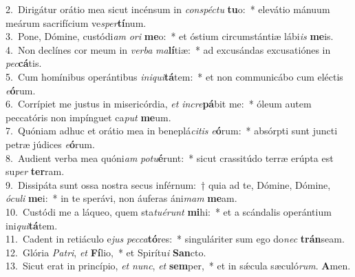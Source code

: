 {2.~}Dirigátur orátio mea sicut incénsum in \textit{con}\textit{spé}\textit{ctu} \textbf{tu}o:~* elevátio mánuum meárum sacrifícium ve\textit{sper}\textbf{tí}num.\\
{3.~}Pone, Dómine, custódi\textit{am} \textit{o}\textit{ri} \textbf{me}o:~* et óstium circumstántiæ lábi\textit{is} \textbf{me}is.\\
{4.~}Non declínes cor meum in \textit{ver}\textit{ba} \textit{ma}\textbf{lí}tiæ:~* ad excusándas excusatiónes in \textit{pec}\textbf{cá}tis.\\
{5.~}Cum homínibus operántibus \textit{i}\textit{ni}\textit{qui}\textbf{tá}tem:~* et non communicábo cum eléctis \textit{e}\textbf{ó}rum.\\
{6.~}Corrípiet me justus in misericórdia, \textit{et} \textit{in}\textit{cre}\textbf{pá}bit me:~* óleum autem peccatóris non impínguet ca\textit{put} \textbf{me}um.\\
{7.~}Quóniam adhuc et orátio mea in beneplá\textit{ci}\textit{tis} \textit{e}\textbf{ó}rum:~* absórpti sunt juncti petræ júdices \textit{e}\textbf{ó}rum.\\
{8.~}Audient verba mea quóni\textit{am} \textit{po}\textit{tu}\textbf{é}runt:~* sicut crassitúdo terræ erúpta est su\textit{per} \textbf{ter}ram.\\
{9.~}Dissipáta sunt ossa nostra secus inférnum:~† quia ad te, Dómine, Dómine, \textit{ó}\textit{cu}\textit{li} \textbf{me}i:~* in te sperávi, non áuferas áni\textit{mam} \textbf{me}am.\\
{10.~}Custódi me a láqueo, quem sta\textit{tu}\textit{é}\textit{runt} \textbf{mi}hi:~* et a scándalis operántium ini\textit{qui}\textbf{tá}tem.\\
{11.~}Cadent in retiáculo e\textit{jus} \textit{pec}\textit{ca}\textbf{tó}res:~* singuláriter sum ego do\textit{nec} \textbf{trán}seam.\\
{12.~}Glória \textit{Pa}\textit{tri}, \textit{et} \textbf{Fí}lio,~* et Spirítu\textit{i} \textbf{San}cto.\\
{13.~}Sicut erat in princípio, \textit{et} \textit{nunc}, \textit{et} \textbf{sem}per,~* et in sǽcula sæculó\textit{rum}. \textbf{A}men.\\
